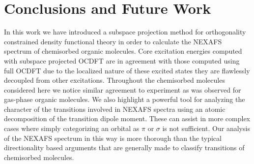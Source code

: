\documentclass{article}
\begin{document}
\begin{comment}
\begin{table}
\footnotesize
\caption{First 10 carbon core excited states of chemisorbed acetylene calculated with TDDFT and OCDFT. Oscillator strengths shown are relative to the strongest transition, root 1 for OCDFT and root 3 for TDDFT. All calculations use the B3LYP functional and all carbon and hydrogen atoms are represented by the cc-pVTZ basis set, while all silicon atoms are represented by the 6-31G basis set. }
\begin{tabular}{cccccc}
\hline
\hline
\multicolumn{2}{c}{TDDFT} &  \multicolumn{2}{c}{OCDFT} \\
\hline
Energy (eV) & $f_{\rm osc}$ & Energy (eV) & $f_{\rm osc}$ & exp. \\
 \hline
273.45 & 0.00000& 284.29 & 1.00000 &\multirow{2}{*}{$\pi^*_{\rm C-C}$(284.7)}\\
273.47 & 0.00000& 284.29 & 0.99749 \\
274.08 & 1.00000& 285.82 & 0.32435 & \multirow{2}{*}{$\sigma^*_{\rm Si-C}$(286.0)}\\
274.09 & 0.29943& 285.82 & 0.32325 \\
274.82 & 0.00000& 286.10 & 0.01792 & \multirow{6}{*}{$\sigma^*_{\rm H-C}$(287.6)} \\
274.83 & 0.00000& 286.10 & 0.01720 \\
275.26 & 0.11816& 286.79 & 0.04289 \\
275.27 & 0.22636& 286.80 & 0.04343 \\
275.43 & 0.00000& 287.09 & 0.02837 \\
275.44 & 0.00000& 287.09 & 0.02813 \\
\hline
\end{tabular}
\label{tab:tddft_comp}
\end{table}
\end{comment}

\section{Conclusions and Future Work}
In this work we have introduced a subspace projection method for orthogonality constrained density functional theory in order to calculate the NEXAFS spectrum of chemisorbed organic molecules. Core excitation energies computed with subspace projected OCDFT are in agreement with those computed using full OCDFT due to the localized nature of these excited states they are flawlessly decoupled from other excitations. Throughout the chemisorbed molecules considered here we notice similar agreement to experiment as was observed for gas-phase organic molecules. We also highlight a powerful tool for analyzing the character of the transitions involved in NEXAFS spectra using an atomic decomposition of the transition dipole moment. These can assist in more complex cases where simply categorizing an orbital as $\pi$ or $\sigma$ is not sufficient. Our analysis of the NEXAFS spectrum in this way is more thorough than the typical directionality based arguments that are generally made to classify transitions of chemisorbed molecules.
\end{document}
